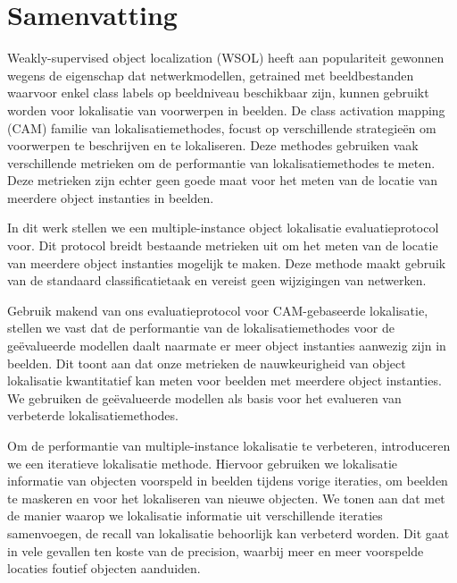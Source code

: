 \chapter*{Samenvatting}

Weakly-supervised object localization (WSOL) heeft aan populariteit gewonnen wegens de eigenschap dat netwerkmodellen, getrained met beeldbestanden waarvoor enkel class labels op beeldniveau beschikbaar zijn, kunnen gebruikt worden voor lokalisatie van voorwerpen in beelden. De class activation mapping (CAM) familie van lokalisatiemethodes, focust op verschillende strategieën om voorwerpen te beschrijven en te lokaliseren. Deze methodes gebruiken vaak verschillende metrieken om de performantie van lokalisatiemethodes te meten. Deze metrieken zijn echter geen goede maat voor het meten van de locatie van meerdere object instanties in beelden.

In dit werk stellen we een multiple-instance object lokalisatie evaluatieprotocol voor. Dit protocol breidt bestaande metrieken uit om het meten van de locatie van meerdere object instanties mogelijk te maken. Deze methode maakt gebruik van de standaard classificatietaak en vereist geen wijzigingen van netwerken.

Gebruik makend van ons evaluatieprotocol voor CAM-gebaseerde lokalisatie, stellen we vast dat de performantie van de lokalisatiemethodes voor de geëvalueerde modellen daalt naarmate er meer object instanties aanwezig zijn in beelden. Dit toont aan dat onze metrieken de nauwkeurigheid van object lokalisatie kwantitatief kan meten voor beelden met meerdere object instanties. We gebruiken de geëvalueerde modellen als basis voor het evalueren van verbeterde lokalisatiemethodes.

Om de performantie van multiple-instance lokalisatie te verbeteren, introduceren we een iteratieve lokalisatie methode. Hiervoor gebruiken we lokalisatie informatie van objecten  voorspeld in beelden tijdens vorige iteraties, om beelden te maskeren en voor het lokaliseren van nieuwe objecten. We tonen aan dat met de manier waarop we lokalisatie informatie uit verschillende iteraties samenvoegen, de recall van lokalisatie behoorlijk kan verbeterd worden. Dit gaat in vele gevallen ten koste van de precision, waarbij meer en meer voorspelde locaties foutief objecten aanduiden.